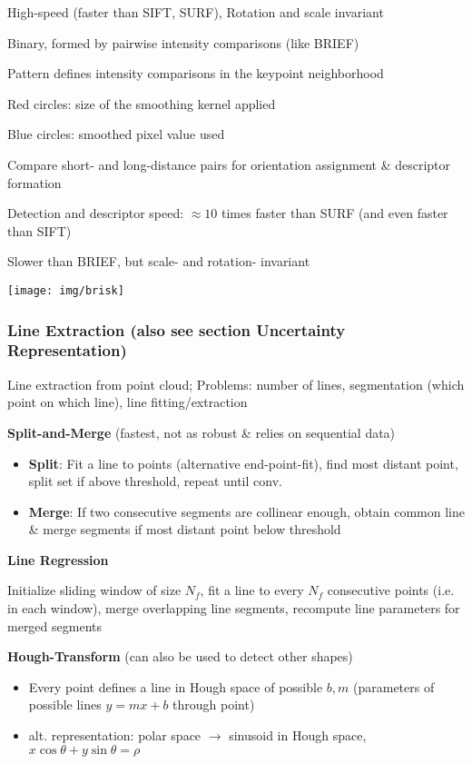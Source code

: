 \documentclass[fontsize=6pt]{scrartcl}
\begin{document}
\begin{multicols*}{4}
High-speed (faster than SIFT, SURF), Rotation and scale invariant

Binary, formed by pairwise intensity comparisons (like BRIEF)

Pattern defines intensity comparisons in the keypoint neighborhood
\begin{minipage}{0.74\linewidth}
Red circles: size of the smoothing kernel applied

Blue circles: smoothed pixel value used

Compare short- and long-distance pairs for orientation assignment \& descriptor formation

Detection and descriptor speed: $\approx 10$ times faster than SURF (and even faster than SIFT)

Slower than BRIEF, but scale- and rotation- invariant
\end{minipage}
\begin{minipage}{0.25\linewidth}
	\texttt{[image: img/brisk]}
\end{minipage}


\subsubsection*{Line Extraction (also see section Uncertainty Representation)}

Line extraction from point cloud; Problems: number of lines, segmentation (which point on which line), line fitting/extraction

\textbf{Split-and-Merge} (fastest, not as robust \& relies on sequential data)
\begin{itemize}
	\item \textbf{Split}: Fit a line to points (alternative end-point-fit), find most distant point, split set if above threshold, repeat until conv.
	\item \textbf{Merge}: If two consecutive segments are collinear enough, obtain common line \& merge segments if most distant point below threshold
\end{itemize}

\textbf{Line Regression}

Initialize sliding window of size $N_f$, fit a line to every $N_f$ consecutive points (i.e. in each window), merge overlapping line segments, recompute line parameters for merged segments

\textbf{Hough-Transform} (can also be used to detect other shapes)
\begin{itemize}
	\item Every point defines a line in Hough space of possible $b, m$ (parameters of possible lines $y=mx+b$ through point)
	\item alt. representation: polar space $\rightarrow$ sinusoid in Hough space, $x\cos \theta + y \sin \theta = \rho$ 
\end{itemize}


\end{multicols*}
\end{document}
